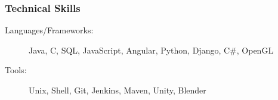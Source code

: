 \documentclass{article}
\begin{document}

\subsubsection*{Technical Skills}
    \begin{description}    
        \item[Languages/Frameworks:] 
            Java, 
            C, 
            SQL,
            JavaScript,
            Angular,
            Python,
            Django, 
            C\#,
            OpenGL

            \vspace{0.5em}

        \item[Tools:] 
            Unix,
            Shell,
            Git,
            Jenkins,
            Maven,
            Unity,
            Blender
    \end{description}
\end{document}
